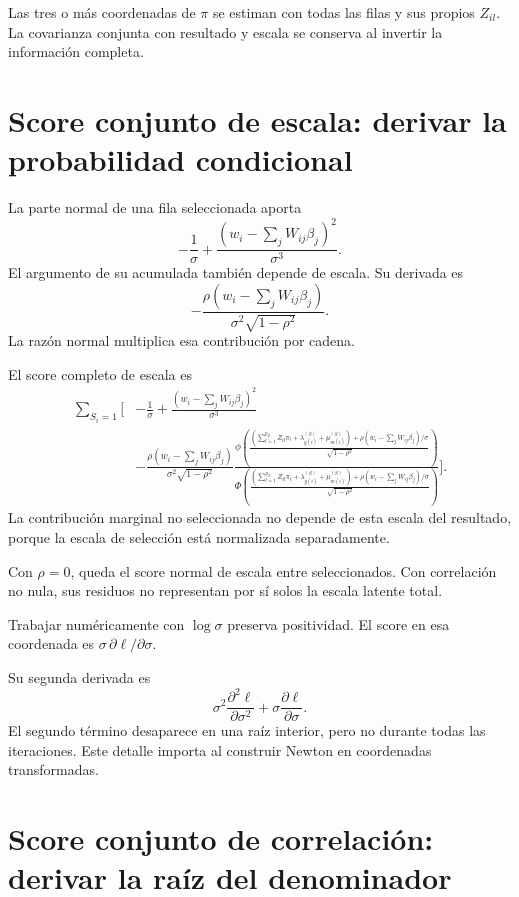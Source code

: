 \documentclass[11pt,a4paper]{article}
\begin{document}
Las tres o más
coordenadas de \(\pi\)
se estiman con todas
las filas y sus
propios \(Z_{il}\).
La covarianza conjunta
con resultado y escala
se conserva al invertir
la información completa.


\clearpage
\section{Score conjunto de escala: derivar la probabilidad condicional}

La parte normal de una
fila seleccionada aporta
\[
-\frac1\sigma+
\frac{(w_i-\sum_jW_{ij}\beta_j)^2}{\sigma^3}.
\]
El argumento de su
acumulada también depende de escala.
Su derivada es
\[
-\frac{\rho(w_i-\sum_jW_{ij}\beta_j)}
{\sigma^2\sqrt{1-\rho^2}}.
\]
La razón normal multiplica
esa contribución por cadena.

El score completo de escala es
\[
\begin{aligned}
\sum_{S_i=1}\Bigg[
&-\frac1\sigma+
\frac{(w_i-\sum_jW_{ij}\beta_j)^2}{\sigma^3}\\
&-\frac{\rho(w_i-\sum_jW_{ij}\beta_j)}
{\sigma^2\sqrt{1-\rho^2}}
\frac{
\phi\left(\frac{\left(\sum_{l=1}^{p_Z}Z_{il}\pi_l+\lambda_{y(i)}^{(S)}+\mu_{m(i)}^{(S)}\right)+
\rho(w_i-\sum_jW_{ij}\beta_j)/\sigma}{\sqrt{1-\rho^2}}\right)}
{\Phi\left(\frac{\left(\sum_{l=1}^{p_Z}Z_{il}\pi_l+\lambda_{y(i)}^{(S)}+\mu_{m(i)}^{(S)}\right)+
\rho(w_i-\sum_jW_{ij}\beta_j)/\sigma}{\sqrt{1-\rho^2}}\right)}
\Bigg].
\end{aligned}
\]
La contribución marginal no
seleccionada no depende
de esta escala del
resultado, porque la
escala de selección está
normalizada separadamente.

\begin{ejemplo}[Independencia]
Con \(\rho=0\), queda
el score normal de
escala entre seleccionados.
Con correlación no nula,
sus residuos no representan
por sí solos la
escala latente total.
\end{ejemplo}
Trabajar numéricamente con
\(\log\sigma\) preserva
positividad. El score en
esa coordenada es
\(\sigma\,\partial\ell/\partial\sigma\).

Su segunda derivada es
\[
\sigma^2\frac{\partial^2\ell}{\partial\sigma^2}
+\sigma\frac{\partial\ell}{\partial\sigma}.
\]
El segundo término desaparece
en una raíz interior,
pero no durante todas
las iteraciones.
Este detalle importa
al construir Newton
en coordenadas transformadas.


\clearpage
\section{Score conjunto de correlación: derivar la raíz del denominador}
\end{document}
